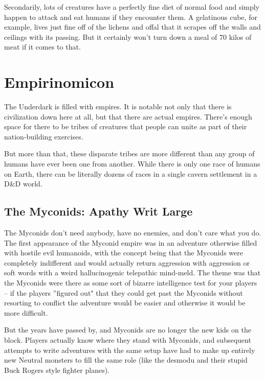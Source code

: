 Secondarily, lots of creatures have a perfectly fine diet of normal food and simply happen to attack and eat humans if they encounter them. A gelatinous cube, for example, lives just fine off of the lichens and offal that it scrapes off the walls and ceilings with its passing. But it certainly won't turn down a meal of 70 kilos of meat if it comes to that.

\section{Empirinomicon}
\vspace*{-10pt}

The Underdark is filled with empires. It is notable not only that there is civilization down here at all, but that there are actual empires. There's enough space for there to be tribes of creatures that people can unite as part of their nation-building exercises.

But more than that, these disparate tribes are more different than any group of humans have ever been one from another. While there is only one race of humans on Earth, there can be literally dozens of races in a single cavern settlement in a D\&D world.

\subsection{The Myconids: Apathy Writ Large}

The Myconids don't need anybody, have no enemies, and don't care what you do. The first appearance of the Myconid empire was in an adventure otherwise filled with hostile evil humanoids, with the concept being that the Myconids were completely indifferent and would actually return aggression with aggression or soft words with a weird hallucinogenic telepathic mind-meld. The theme was that the Myconids were there as some sort of bizarre intelligence test for your players -- if the players ''figured out" that they could get past the Myconids without resorting to conflict the adventure would be easier and otherwise it would be more difficult.

But the years have passed by, and Myconids are no longer the new kids on the block. Players actually know where they stand with Myconids, and subsequent attempts to write adventures with the same setup have had to make up entirely new Neutral monsters to fill the same role (like the desmodu and their stupid Buck Rogers style fighter planes).

